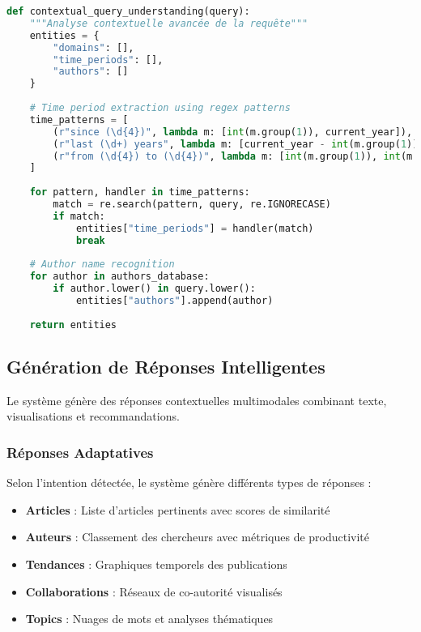 \documentclass[12pt,a4paper]{article}
\begin{document}
\begin{lstlisting}[language=Python, caption=Extraction d'entités contextuelles]
def contextual_query_understanding(query):
    """Analyse contextuelle avancée de la requête"""
    entities = {
        "domains": [],
        "time_periods": [],
        "authors": []
    }
    
    # Time period extraction using regex patterns
    time_patterns = [
        (r"since (\d{4})", lambda m: [int(m.group(1)), current_year]),
        (r"last (\d+) years", lambda m: [current_year - int(m.group(1)), current_year]),
        (r"from (\d{4}) to (\d{4})", lambda m: [int(m.group(1)), int(m.group(2))])
    ]
    
    for pattern, handler in time_patterns:
        match = re.search(pattern, query, re.IGNORECASE)
        if match:
            entities["time_periods"] = handler(match)
            break
    
    # Author name recognition
    for author in authors_database:
        if author.lower() in query.lower():
            entities["authors"].append(author)
    
    return entities
\end{lstlisting}

\subsection{Génération de Réponses Intelligentes}

Le système génère des réponses contextuelles multimodales combinant texte, visualisations et recommandations.

\subsubsection{Réponses Adaptatives}

Selon l'intention détectée, le système génère différents types de réponses :

\begin{itemize}
    \item \textbf{Articles} : Liste d'articles pertinents avec scores de similarité
    \item \textbf{Auteurs} : Classement des chercheurs avec métriques de productivité
    \item \textbf{Tendances} : Graphiques temporels des publications
    \item \textbf{Collaborations} : Réseaux de co-autorité visualisés
    \item \textbf{Topics} : Nuages de mots et analyses thématiques
\end{itemize}
\end{document}
